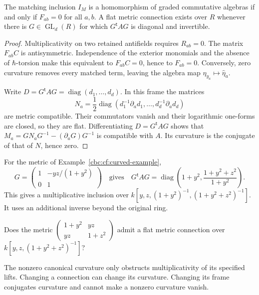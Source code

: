 \begin{proposition}\label{cbc:cf:flat}
The matching inclusion $I_M$ is a homomorphism of graded
commutative algebras if and only if $F_{ab}=0$ for all $a,b$.
A flat metric connection exists over $R$ whenever there is
$G\in\operatorname{GL}_d(R)$ for which $G^{\mathsf t}AG$
is diagonal and invertible.
\end{proposition}
\begin{proof}
Multiplicativity on two retained antifields requires $R_{ab}=0$.
The matrix $F_{ab}C$ is antisymmetric. Independence of the
exterior monomials and the absence of $\hbar$-torsion make this
equivalent to $F_{ab}C=0$, hence to $F_{ab}=0$.
Conversely, zero curvature removes every matched term, leaving
the algebra map $\eta_{y_a}\mapsto\widehat\eta_a$.

Write $D=G^{\mathsf t}AG=\operatorname{diag}(d_1,\ldots,d_d)$.
In this frame the matrices
\[
 N_a=\frac12\operatorname{diag}
       (d_1^{-1}\partial_ad_1,\ldots,d_d^{-1}\partial_ad_d)
\]
are metric compatible. Their commutators vanish and their
logarithmic one-forms are closed, so they are flat. Differentiating
$D=G^{\mathsf t}AG$ shows that
$M_a=GN_aG^{-1}-(\partial_aG)G^{-1}$ is compatible with $A$.
Its curvature is the conjugate of that of $N$, hence zero.
\end{proof}

For the metric of Example~\ref{cbc:cf:curved-example},
\[
 G=\begin{pmatrix}1&-yz/(1+y^2)\\0&1\end{pmatrix}
 \quad\text{gives}\quad
 G^{\mathsf t}AG=
 \operatorname{diag}\left(1+y^2,\frac{1+y^2+z^2}{1+y^2}\right).
\]
This gives a multiplicative inclusion over
$k[y,z,(1+y^2)^{-1},(1+y^2+z^2)^{-1}]$.
It uses an additional inverse beyond the original ring.

\begin{problem}\label{cbc:cf:flat-question}
Does the metric
$\left(\begin{smallmatrix}1+y^2&yz\\yz&1+z^2\end{smallmatrix}\right)$
admit a flat metric connection over
$k[y,z,(1+y^2+z^2)^{-1}]$?
\end{problem}

The nonzero canonical curvature only obstructs multiplicativity
of its specified lifts. Changing a connection can change its
curvature. Changing its frame conjugates curvature and cannot
make a nonzero curvature vanish.

